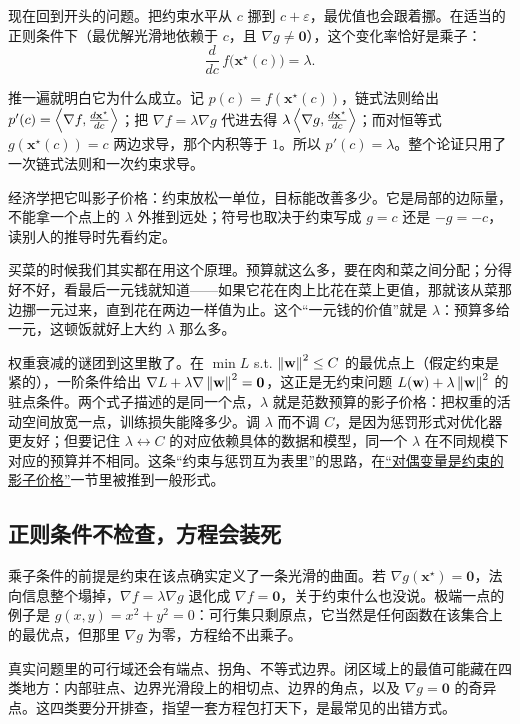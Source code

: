 现在回到开头的问题。把约束水平从 \(c\) 挪到 \(c+\varepsilon\)，最优值也会跟着挪。在适当的正则条件下（最优解光滑地依赖于 \(c\)，且 \(\nabla g\ne\mathbf0\)），这个变化率恰好是乘子：
\[
\frac{d}{dc}\,f\bigl(\mathbf x^\star(c)\bigr)=\lambda .
\]

推一遍就明白它为什么成立。记 \(p(c)=f(\mathbf x^\star(c))\)，链式法则给出 \(p'(c)=\left\langle\nabla f,\tfrac{d\mathbf x^\star}{dc}\right\rangle\)；把 \(\nabla f=\lambda\nabla g\) 代进去得 \(\lambda\left\langle\nabla g,\tfrac{d\mathbf x^\star}{dc}\right\rangle\)；而对恒等式 \(g(\mathbf x^\star(c))=c\) 两边求导，那个内积等于 \(1\)。所以 \(p'(c)=\lambda\)。整个论证只用了一次链式法则和一次约束求导。

经济学把它叫影子价格：约束放松一单位，目标能改善多少。它是局部的边际量，不能拿一个点上的 \(\lambda\) 外推到远处；符号也取决于约束写成 \(g=c\) 还是 \(-g=-c\)，读别人的推导时先看约定。

买菜的时候我们其实都在用这个原理。预算就这么多，要在肉和菜之间分配；分得好不好，看最后一元钱就知道——如果它花在肉上比花在菜上更值，那就该从菜那边挪一元过来，直到花在两边一样值为止。这个``一元钱的价值''就是 \(\lambda\)：预算多给一元，这顿饭就好上大约 \(\lambda\) 那么多。

权重衰减的谜团到这里散了。在 \(\min L\) s.t. \(\left\lVert\mathbf w\right\rVert^2\le C\) 的最优点上（假定约束是紧的），一阶条件给出 \(\nabla L+\lambda\nabla\left\lVert\mathbf w\right\rVert^2=\mathbf 0\)，这正是无约束问题 \(L(\mathbf w)+\lambda\left\lVert\mathbf w\right\rVert^2\) 的驻点条件。两个式子描述的是同一个点，\(\lambda\) 就是范数预算的影子价格：把权重的活动空间放宽一点，训练损失能降多少。调 \(\lambda\) 而不调 \(C\)，是因为惩罚形式对优化器更友好；但要记住 \(\lambda\leftrightarrow C\) 的对应依赖具体的数据和模型，同一个 \(\lambda\) 在不同规模下对应的预算并不相同。这条``约束与惩罚互为表里''的思路，在\hyperref[sec:09-Convex-Optimization/05-Duality/04]{``对偶变量是约束的影子价格''}一节里被推到一般形式。

\subsection{正则条件不检查，方程会装死}

乘子条件的前提是约束在该点确实定义了一条光滑的曲面。若 \(\nabla g(\mathbf x^\star)=\mathbf 0\)，法向信息整个塌掉，\(\nabla f=\lambda\nabla g\) 退化成 \(\nabla f=\mathbf 0\)，关于约束什么也没说。极端一点的例子是 \(g(x,y)=x^2+y^2=0\)：可行集只剩原点，它当然是任何函数在该集合上的最优点，但那里 \(\nabla g\) 为零，方程给不出乘子。

真实问题里的可行域还会有端点、拐角、不等式边界。闭区域上的最值可能藏在四类地方：内部驻点、边界光滑段上的相切点、边界的角点，以及 \(\nabla g=\mathbf 0\) 的奇异点。这四类要分开排查，指望一套方程包打天下，是最常见的出错方式。

